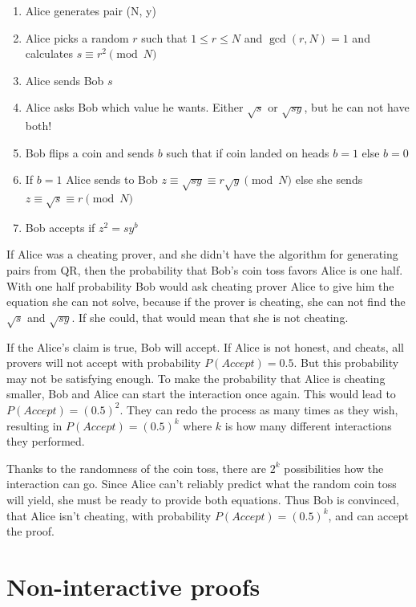 \begin{enumerate}
    \item Alice generates pair (N, y)
    \item Alice picks a random $r$ such that $1 \leq r \leq N$ and $\gcd(r, N) = 1$
          and calculates $s \equiv r^2 \pmod{N}$
    \item Alice sends Bob $s$
    \item Alice asks Bob which value he wants. Either $\sqrt{s}$ or $\sqrt{sy}$, but he can not have both!
    \item Bob flips a coin and sends $b$ such that if coin landed on heads $b = 1$ else $b = 0$
    \item If $b = 1$ Alice sends to Bob $z \equiv \sqrt{sy} \equiv r \sqrt{y} \pmod{N}$ else she sends $z \equiv \sqrt{s} \equiv r \pmod{N}$
    \item Bob accepts if $z^2 = sy^b$
\end{enumerate}

If Alice was a cheating prover, and she didn't have the algorithm for
generating pairs from QR, then the probability that Bob's coin toss favors
Alice is one half. With one half probability Bob would ask cheating prover
Alice to give him the equation she can not solve, because if the prover is
cheating, she can not find the $\sqrt{s}$ and $\sqrt{sy}$. If she could,
that would mean that she is not cheating.

If the Alice's claim is true, Bob will accept. If Alice is not honest, and
cheats, all provers will not accept with probability $P(Accept) = 0.5$.
But this probability may not be satisfying enough. To make the probability
that Alice is cheating smaller, Bob and Alice can start the interaction once
again. This would lead to $P(Accept) = (0.5)^2$. They can redo the process
as many times as they wish, resulting in $P(Accept) = (0.5)^k$ where $k$
is how many different interactions they performed.

Thanks to the randomness of the coin toss, there are $2^k$ possibilities how
the interaction can go. Since Alice can't reliably predict what the random
coin toss will yield, she must be ready to provide both equations. Thus Bob is
convinced, that Alice isn't cheating, with probability $P(Accept) = (0.5)^k$,
and can accept the proof.

\section{Non-interactive proofs}

